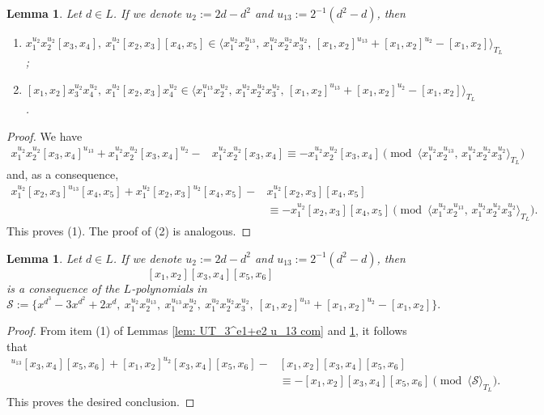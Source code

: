 \documentclass[a4paper,reqno]{amsart}
\newtheorem{lemma}[theorem]{Lemma}
\theoremstyle{definition}
\numberwithin{equation}{section}
\numberwithin{theorem}{section}
\begin{document}
\begin{lemma}\label{lem: UT_3^e1+e2 u_2 com}
    Let $d\in L$. If we denote $u_{2}:=2d -d^2$ and $u_{13}:=2^{-1}(d^2 - d)$, then 
    \begin{enumerate}
        \item $x_1^{u_{2}} x_2^{u_{2}}[x_3,x_4],  \ x_1^{u_{2}} [x_2, x_3][x_4,x_5]\in \langle x_1^{u_{2}}x_2^{u_{13}}, \, x_1^{u_{2}} x_2^{u_{2}}x_3^{u_{2}}, \, [x_1,x_2]^{u_{13}}+ [x_1,x_2]^{u_{2}} - [x_1,x_2] \rangle_{T_L}$;
        \vspace{1mm}
        \item $[x_1, x_2]x_3^{u_{2}}x_4^{u_{2}}, \ x_1^{u_{2}} [x_2, x_3]x_4^{u_{2}} \in \langle  x_1^{u_{13}}x_2^{u_{2}}, \, x_1^{u_{2}} x_2^{u_{2}}x_3^{u_{2}}, \, [x_1,x_2]^{u_{13}}+ [x_1,x_2]^{u_{2}} - [x_1,x_2] \rangle_{T_L}$.
    \end{enumerate}
\end{lemma}
\begin{proof}
We have 
    \begin{align*}
        x_1^{u_{2}} x_2^{u_{2}}[x_3,x_4]^{u_{13}}+ x_1^{u_{2}} x_2^{u_{2}}[x_3,x_4]^{u_{2}} - &x_1^{u_{2}} x_2^{u_{2}}[x_3,x_4]\equiv - x_1^{u_{2}} x_2^{u_{2}}[x_3,x_4] \pmod{\langle x_1^{u_{2}}x_2^{u_{13}}, \, x_1^{u_{2}} x_2^{u_{2}}x_3^{u_{2}} \rangle_{T_L}}
    \end{align*}
    and, as a consequence,
     \begin{align*}
        x_1^{u_{2}} [x_2, x_3]^{u_{13}}[x_4,x_5] + x_1^{u_{2}} [x_2, x_3]^{u_{2}}[x_4,x_5] - &x_1^{u_{2}} [x_2, x_3][x_4,x_5]\\
        &\equiv - x_1^{u_{2}} [x_2, x_3][x_4,x_5] \pmod{\langle x_1^{u_{2}}x_2^{u_{13}}, \, x_1^{u_{2}} x_2^{u_{2}}x_3^{u_{2}} \rangle_{T_L}}.
    \end{align*}
    This proves (1). The proof of (2) is analogous.
\end{proof}


\begin{lemma}\label{lem: UT_3^e1+e2 3comm}
    Let $d\in L$. If we denote $u_{2}:=2d -d^2$ and $u_{13}:=2^{-1}(d^2 - d)$, then 
    $$[x_1,x_2][x_3,x_4][x_5,x_6]$$
    is a consequence of the $L$-polynomials in 
    $$\mathcal{S}:=\{ x^{d^3}-3x^{d^2}+2x^{d},\ x_1^{u_{2}}x_2^{u_{13}}, \ x_1^{u_{13}}x_2^{u_{2}}, \ x_1^{u_{2}} x_2^{u_{2}}x_3^{u_{2}}, \ [x_1,x_2]^{u_{13}}+ [x_1,x_2]^{u_{2}} - [x_1,x_2]\}.$$
\end{lemma}
\begin{proof}
    From item (1) of Lemmas \ref{lem: UT_3^e1+e2 u_13 com} and \ref{lem: UT_3^e1+e2 u_2 com}, it follows that
    \begin{align*}
        [x_1,x_2]^{u_{13}}[x_3,x_4][x_5,x_6]+[x_1,x_2]^{u_{2}}[x_3,x_4][x_5,x_6] - &[x_1,x_2][x_3,x_4][x_5,x_6]\\
        &\equiv - [x_1,x_2][x_3,x_4][x_5,x_6] \pmod{\langle \mathcal{S}\rangle_{T_L}}.
    \end{align*}
    This proves the desired conclusion.
\end{proof}
\end{document}
